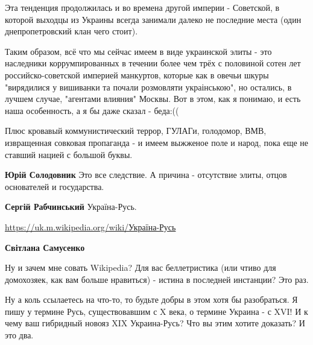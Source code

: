 \begin{itemize}
\begin{itemize}
Эта тенденция продолжилась и во времена другой империи - Советской, в которой
выходцы из Украины всегда занимали далеко не последние места (один
днепропетровский клан чего стоит).

Таким образом, всё что мы сейчас имеем в виде украинской элиты - это наследники
коррумпированных в течении более чем трёх с половиной сотен лет
российско-советской империей манкуртов, которые как в овечьи шкуры "вирядилися
у вишиванки та почали розмовляти украінською", но остались, в лучшем случае,
"агентами влияния" Москвы. Вот в этом, как я понимаю, и есть наша особенность,
а я бы даже сказал - беда:((


Плюс кровавый коммунистический террор, ГУЛАГи, голодомор, ВМВ, извращенная
совковая пропаганда - и имеем выжженое поле и народ, пока еще не ставший нацией
с большой буквы.


 
\textbf{Юрій Солодовник} Это все следствие. А причина - отсутствие элиты, отцов основателей и государства.

 
\textbf{Сергій Рабчинський} Україна-Русь.

\url{https://uk.m.wikipedia.org/wiki/Україна-Русь}

 
\textbf{Світлана Самусенко} 

Ну и зачем мне совать Wikipedia? Для вас беллетристика (или чтиво для
домохозяек, как вам больше нравиться) - истина в последней инстанции? Это раз.

Ну а коль ссылаетесь на что-то, то будьте добры в этом хотя бы разобраться. Я
пишу у термине Русь, существовавшим с X века, о термине Украина - с XVI! И к
чему ваш гибридный новояз XIX Украина-Русь? Что вы этим хотите доказать? И это
два.




\end{itemize}
\end{itemize}
